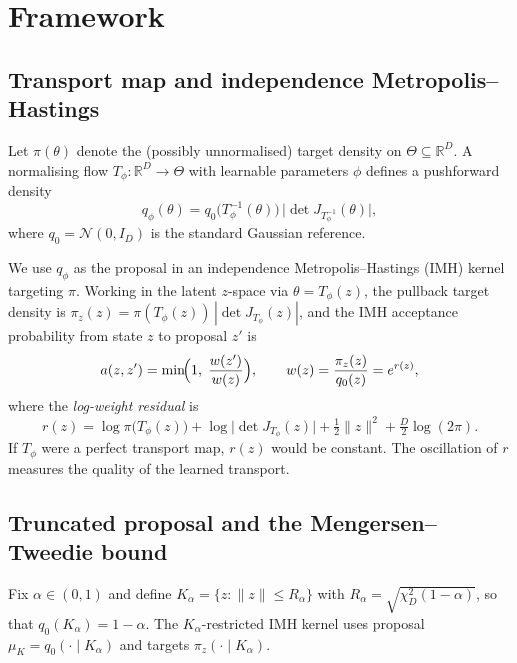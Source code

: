 \documentclass[12pt]{article}
\newcommand{\R}{\mathbb{R}}
\begin{document}
\section{Framework}\label{sec:framework}

\subsection{Transport map and independence Metropolis--Hastings}\label{sec:transport}

Let $\pi(\theta)$ denote the (possibly unnormalised) target density on $\Theta \subseteq \R^D$.
A normalising flow $T_\phi : \R^D \to \Theta$ with learnable parameters $\phi$ defines a pushforward density
\[
  q_\phi(\theta) = q_0\bigl(T_\phi^{-1}(\theta)\bigr) \,\bigl|\det J_{T_\phi^{-1}}(\theta)\bigr|,
\]
where $q_0 = \mathcal{N}(0, I_D)$ is the standard Gaussian reference.

We use $q_\phi$ as the proposal in an independence Metropolis--Hastings (IMH) kernel targeting $\pi$.
Working in the latent $z$-space via $\theta = T_\phi(z)$, the pullback target density is $\pi_z(z) = \pi(T_\phi(z))\,|\det J_{T_\phi}(z)|$, and the IMH acceptance probability from state $z$ to proposal $z'$ is
\[
  a(z, z') = \min\!\Bigl(1,\; \frac{w(z')}{w(z)}\Bigr), \qquad w(z) = \frac{\pi_z(z)}{q_0(z)} = e^{r(z)},
\]
where the \emph{log-weight residual} is
\begin{equation}\label{eq:residual}
  r(z) = \log \pi\bigl(T_\phi(z)\bigr) + \log\bigl|\det J_{T_\phi}(z)\bigr| + \tfrac{1}{2}\|z\|^2 + \tfrac{D}{2}\log(2\pi).
\end{equation}
If $T_\phi$ were a perfect transport map, $r(z)$ would be constant.
The oscillation of $r$ measures the quality of the learned transport.

\subsection{Truncated proposal and the Mengersen--Tweedie bound}\label{sec:mt}

Fix $\alpha \in (0,1)$ and define $K_\alpha = \{z : \|z\| \le R_\alpha\}$ with $R_\alpha = \sqrt{\chi^2_D(1-\alpha)}$, so that $q_0(K_\alpha) = 1-\alpha$.
The $K_\alpha$-restricted IMH kernel uses proposal $\mu_K = q_0(\cdot \mid K_\alpha)$ and targets $\pi_z(\cdot \mid K_\alpha)$.
\end{document}
